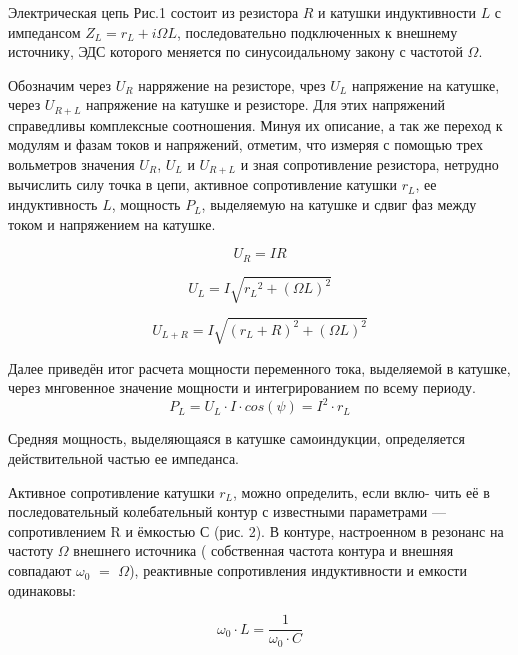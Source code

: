Электрическая цепь Рис.1 состоит из резистора $R$ и катушки индуктивности $L$ с импедансом $Z_L = r_L + i{\Omega}L$, последовательно подключенных к внешнему источнику, ЭДС которого меняется по синусоидальному закону с частотой $\Omega$.

Обозначим через $U_R$ нарряжение на резисторе, чрез $U_L$ напряжение на катушке, через $U_{R+L}$ напряжение на катушке и резисторе. Для этих напряжений справедливы комплексные соотношения.
\newline
Минуя их описание, а так же переход к модулям и фазам токов и напряжений, отметим, что измеряя с помощью трех вольметров значения $U_R$, $U_L$ и $U_{R+L}$ и зная сопротивление резистора, нетрудно вычислить силу точка в цепи, активное сопротивление катушки $r_L$, ее индуктивность $L$, мощность $P_L$, выделяемую на катушке и сдвиг фаз между током и напряжением на катушке.

\begin{equation}\label{}
U_R = {I}{R}
\end{equation}

\begin{equation}\label{r_l sq}
U_L = {I}{\sqrt{{r_L}^2 + ({\Omega}{L})^2}} 
\end{equation}

\begin{equation}\label{}
U_{L+R} = {I}{\sqrt{ (r_L + R)^2 + ({\Omega}{L})^2}} 
\end{equation}

Далее приведён итог расчета мощности переменного тока, выделяемой в катушке, через мнговенное значение мощности и интегрированием по всему периоду. 
\begin{equation}\label{}
P_L = U_L\cdot I\cdot cos(\psi) = I^2\cdot r_L
\end{equation}

Средняя мощность, выделяющаяся в катушке самоиндукции, определяется действительной частью ее импеданса.

Активное сопротивление катушки $r_L$, можно определить, если вклю-
чить её в последовательный колебательный контур с известными параметрами — сопротивлением R и ёмкостью С (рис. 2). В контуре, настроенном в резонанс на частоту $\Omega$ внешнего источника ( собственная частота контура и внешняя совпадают $\omega_0$ $=$ $\Omega$), реактивные сопротивления индуктивности и емкости одинаковы:

\begin{equation}\label{}
\omega_0 \cdot L = \frac{1}{\omega_0\cdot C}
\end{equation}

